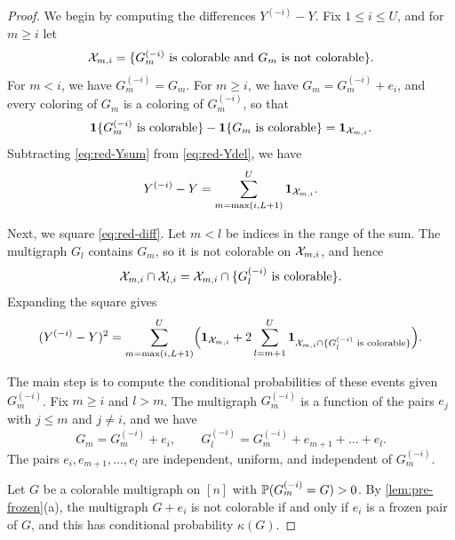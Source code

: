 \begin{proof}
We begin by computing the differences $Y^{(-i)} - Y$. Fix $1 \le i \le U$, and for $m \ge i$ let
\begin{equation*}
\mathcal X_{m, i} = \{G_m^{(-i)} \text{ is colorable and } G_m \text{ is not colorable}\}.
\end{equation*}
For $m < i$, we have $G_m^{(-i)} = G_m$. For $m \ge i$, we have $G_m = G_m^{(-i)} + e_i$, and every coloring of $G_m$ is a coloring of $G_m^{(-i)}$, so that
\begin{equation*}
\mathbf 1\{G_m^{(-i)} \text{ is colorable}\} - \mathbf 1\{G_m \text{ is colorable}\} = \mathbf 1_{\mathcal X_{m, i}}.
\end{equation*}
Subtracting \eqref{eq:red-Ysum} from \eqref{eq:red-Ydel}, we have
\begin{equation}\label{eq:red-diff}
Y^{(-i)} - Y = \sum_{m = \max(i, L + 1)}^{U} \mathbf 1_{\mathcal X_{m, i}}.
\end{equation}

Next, we square \eqref{eq:red-diff}. Let $m < l$ be indices in the range of the sum. The multigraph $G_l$ contains $G_m$, so it is not colorable on $\mathcal X_{m, i}$, and hence
\begin{equation*}
\mathcal X_{m, i} \cap \mathcal X_{l, i} = \mathcal X_{m, i} \cap \{G_l^{(-i)} \text{ is colorable}\}.
\end{equation*}
Expanding the square gives
\begin{equation}\label{eq:red-square}
(Y^{(-i)} - Y)^2 = \sum_{m = \max(i, L + 1)}^{U} \Bigl(\mathbf 1_{\mathcal X_{m, i}} + 2 \sum_{l = m + 1}^{U} \mathbf 1_{\mathcal X_{m, i} \cap \{G_l^{(-i)} \text{ is colorable}\}}\Bigr).
\end{equation}

The main step is to compute the conditional probabilities of these events given $G_m^{(-i)}$. Fix $m \ge i$ and $l > m$. The multigraph $G_m^{(-i)}$ is a function of the pairs $e_j$ with $j \le m$ and $j \ne i$, and we have
\begin{equation*}
G_m = G_m^{(-i)} + e_i, \qquad G_l^{(-i)} = G_m^{(-i)} + e_{m + 1} + \dots + e_l.
\end{equation*}
The pairs $e_i, e_{m + 1}, \dots, e_l$ are independent, uniform, and independent of $G_m^{(-i)}$.

Let $G$ be a colorable multigraph on $[n]$ with $\mathbb P(G_m^{(-i)} = G) > 0$. By \cref{lem:pre-frozen}(a), the multigraph $G + e_i$ is not colorable if and only if $e_i$ is a frozen pair of $G$, and this has conditional probability $\kappa(G)$.


\end{proof}

